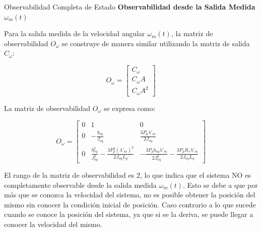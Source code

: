 \documentclass[12pt]{beamer}
\begin{document}
\begin{frame}{Observabilidad Completa de Estado}\scriptsize
\textbf{Observabilidad desde la Salida Medida $\omega_m(t)$}

Para la salida medida de la velocidad angular \(\omega_m(t)\), la matriz de observabilidad \( O_{\omega} \) se construye de manera similar utilizando la matriz de salida \( C_{\omega} \):

\[
O_{\omega} = \begin{bmatrix}
C_{\omega} \\
C_{\omega} A \\
C_{\omega} A^2
\end{bmatrix}
\]

La matriz de observabilidad \( O_{\omega} \) se expresa como:

\[
O_{\omega} = \begin{bmatrix}
0 & 1 & 0 \\
0 & -\frac{b_{\text{eq}}}{J_{\text{eq}}} & \frac{3 P_{p} \lambda'_{m}}{2 J_{\text{eq}}} \\
0 & \frac{b_{\text{eq}}^2}{J_{\text{eq}}^2} - \frac{3 P_{p}^2 (\lambda'_{m})^2}{2 J_{\text{eq}} L_q} & -\frac{3 P_{p} b_{\text{eq}} \lambda'_{m}}{2 J_{\text{eq}}^2} - \frac{3 P_{p} R_s \lambda'_{m}}{2 J_{\text{eq}} L_q}
\end{bmatrix}
\]

El rango de la matriz de observabilidad es 2, lo que indica que el sistema NO es completamente observable desde la salida medida \(\omega_m(t)\). Esto se debe a que por más que se conozca la velocidad del sistema, no es posible obtener la posición del mismo sin conocer la condición inicial de posición. Caso contrario a lo que sucede cuando se conoce la posición del sistema, ya que si se la deriva, se puede llegar a conocer la velocidad del mismo.
\end{frame}
\end{document}
